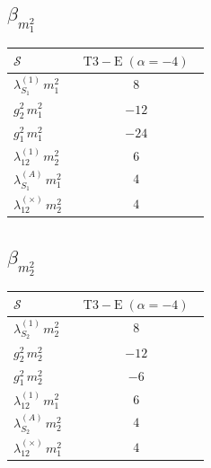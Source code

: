 \documentclass[9pt]{article}
\begin{document}
\subsection*{$ \beta_{m_1^{2}} $}
\begin{longtable}{@{}p{0.31\linewidth}c@{}}
\toprule
$\mathcal{S}$ & $ \mathrm{T3-E}\;(\alpha=-4) $ \\
\midrule
$ \lambda_{S_1}^{(1)}\,m_1^{2} $ & $ 8 $ \\
$ g_2^2\,m_1^{2} $ & $ -12 $ \\
$ g_1^2\,m_1^{2} $ & $ -24 $ \\
$ \lambda_{12}^{(1)}\,m_2^{2} $ & $ 6 $ \\
$ \lambda_{S_1}^{(A)}\,m_1^{2} $ & $ 4 $ \\
$ \lambda_{12}^{(\times)}\,m_2^{2} $ & $ 4 $ \\
\bottomrule
\end{longtable}
\subsection*{$ \beta_{m_2^{2}} $}
\begin{longtable}{@{}p{0.31\linewidth}c@{}}
\toprule
$\mathcal{S}$ & $ \mathrm{T3-E}\;(\alpha=-4) $ \\
\midrule
$ \lambda_{S_2}^{(1)}\,m_2^{2} $ & $ 8 $ \\
$ g_2^2\,m_2^{2} $ & $ -12 $ \\
$ g_1^2\,m_2^{2} $ & $ -6 $ \\
$ \lambda_{12}^{(1)}\,m_1^{2} $ & $ 6 $ \\
$ \lambda_{S_2}^{(A)}\,m_2^{2} $ & $ 4 $ \\
$ \lambda_{12}^{(\times)}\,m_1^{2} $ & $ 4 $ \\
\bottomrule
\end{longtable}
\end{document}
